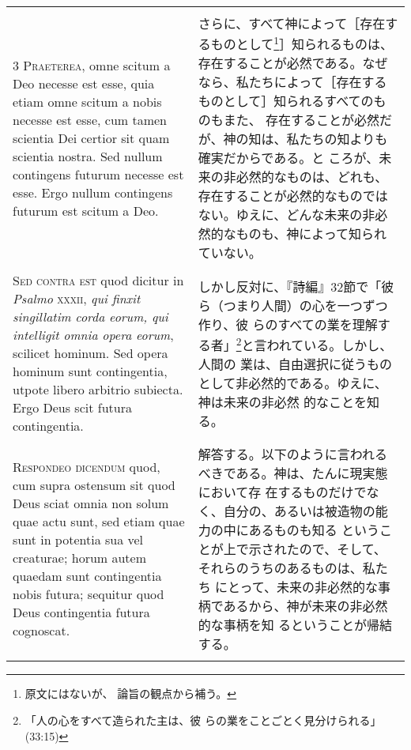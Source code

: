 \documentclass[10pt]{jsarticle} %
\begin{document}
\begin{longtable}{p{21em}p{21em}}
\\
\\

3 {\scshape Praeterea}, omne scitum a Deo necesse est esse, quia etiam
omne scitum a nobis necesse est esse, cum tamen scientia Dei certior
sit quam scientia nostra. Sed nullum contingens futurum necesse est
esse. Ergo nullum contingens futurum est scitum a Deo.

&

さらに、すべて神によって［存在するものとして\footnote{原文にはないが、
論旨の観点から補う。}］知られるものは、存在することが必然である。なぜ
なら、私たちによって［存在するものとして］知られるすべてのものもまた、
存在することが必然だが、神の知は、私たちの知よりも確実だからである。と
ころが、未来の非必然的なものは、どれも、存在することが必然的なものでは
ない。ゆえに、どんな未来の非必然的なものも、神によって知られていない。

\\
\\

{\scshape Sed contra est} quod dicitur in {\itshape Psalmo} {\scshape
xxxii}, {\itshape qui finxit singillatim corda eorum, qui intelligit
omnia opera eorum}, scilicet hominum. Sed opera hominum sunt
contingentia, utpote libero arbitrio subiecta. Ergo Deus scit futura
contingentia.


&

しかし反対に、『詩編』32節で「彼ら（つまり人間）の心を一つずつ作り、彼
らのすべての業を理解する者」\footnote{「人の心をすべて造られた主は、彼
らの業をことごとく見分けられる」(33:15)}と言われている。しかし、人間の
業は、自由選択に従うものとして非必然的である。ゆえに、神は未来の非必然
的なことを知る。

\\\\


{\scshape Respondeo dicendum} quod, cum supra ostensum sit quod Deus
sciat omnia non solum quae actu sunt, sed etiam quae sunt in potentia
sua vel creaturae; horum autem quaedam sunt contingentia nobis futura;
sequitur quod Deus contingentia futura cognoscat.


&

解答する。以下のように言われるべきである。神は、たんに現実態において存
在するものだけでなく、自分の、あるいは被造物の能力の中にあるものも知る
ということが上で示されたので、そして、それらのうちのあるものは、私たち
にとって、未来の非必然的な事柄であるから、神が未来の非必然的な事柄を知
るということが帰結する。

\\\\



\end{longtable}
\end{document}
